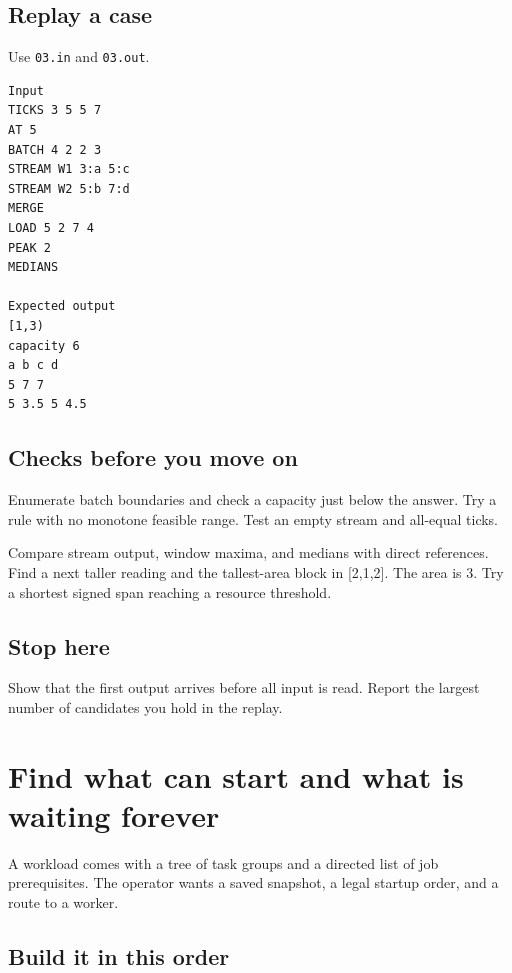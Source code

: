\documentclass[11pt,letterpaper]{article}
\begin{document}
\subsection*{Replay a case}

Use \texttt{03.in} and \texttt{03.out}.

\begin{samepage}
\small
\begin{verbatim}
Input
TICKS 3 5 5 7
AT 5
BATCH 4 2 2 3
STREAM W1 3:a 5:c
STREAM W2 5:b 7:d
MERGE
LOAD 5 2 7 4
PEAK 2
MEDIANS

Expected output
[1,3)
capacity 6
a b c d
5 7 7
5 3.5 5 4.5
\end{verbatim}
\end{samepage}

\subsection*{Checks before you move on}

Enumerate batch boundaries and check a capacity just below the answer. Try a rule with no monotone feasible range. Test an empty stream and all-equal ticks.

Compare stream output, window maxima, and medians with direct references. Find a next taller reading and the tallest-area block in [2,1,2]. The area is 3. Try a shortest signed span reaching a resource threshold.

\subsection*{Stop here}

Show that the first output arrives before all input is read. Report the largest number of candidates you hold in the replay.

\clearpage

\section{Find what can start and what is waiting forever}\label{datacenter:04}

A workload comes with a tree of task groups and a directed list of job prerequisites. The operator wants a saved snapshot, a legal startup order, and a route to a worker.

\subsection*{Build it in this order}
\end{document}
